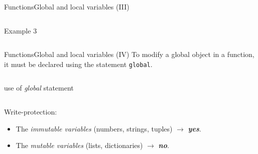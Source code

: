 \documentclass[10pt,compress]{beamer} %
\begin{document}
\begin{frame}{Functions}{Global and local variables (III)}

    \begin{columns}
		\begin{block}{Example 3}
		\vspace{-0.2cm}
		
		\vspace{-0.2cm}
		\end{block}
	\end{columns}

\end{frame}


\begin{frame}{Functions}{Global and local variables (IV)}
\vspace{-0.2cm}
	To modify a global object in a function, it must be declared using the statement \texttt{global}.
    \begin{columns}
		\begin{block}{use of \textit{global} statement}
		\vspace{-0.4cm}
		
		\vspace{-0.4cm}
		\end{block}
	\end{columns}

	Write-protection:
	\begin{itemize}
		\item The \textit{immutable variables} (numbers, strings, tuples) $\rightarrow$ \textbf{\emph{yes}}.
		\item The \textit{mutable variables} (lists, dictionaries) $\rightarrow$ \alert{\textbf{\emph{no}}}.
	\end{itemize}

\end{frame}
\end{document}
